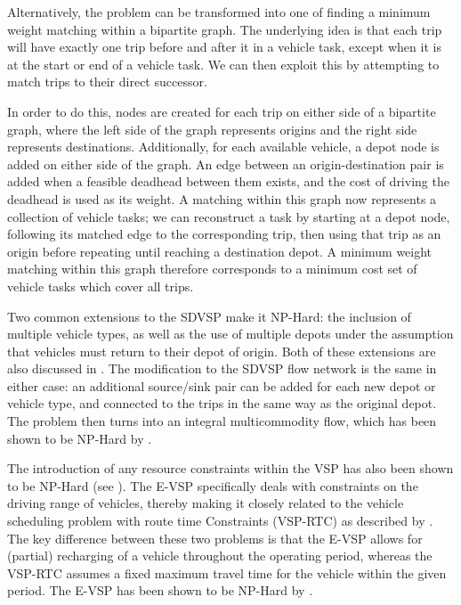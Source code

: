 \documentclass[]{article}
\begin{document}
Alternatively, the problem can be transformed into one of finding a minimum weight matching within a bipartite graph. The underlying idea is that each trip will have exactly one trip before and after it in a vehicle task, except when it is at the start or end of a vehicle task. We can then exploit this by attempting to match trips to their direct successor.

In order to do this, nodes are created for each trip on either side of a bipartite graph, where the left side of the graph represents origins and the right side represents destinations. Additionally, for each available vehicle, a depot node is added on either side of the graph. An edge between an origin-destination pair is added when a feasible deadhead between them exists, and the cost of driving the deadhead is used as its weight. A matching within this graph now represents a collection of vehicle tasks; we can reconstruct a task by starting at a depot node, following its matched edge to the corresponding trip, then using that trip as an origin before repeating until reaching a destination depot. A minimum weight matching within this graph therefore corresponds to a minimum cost set of vehicle tasks which cover all trips.

Two common extensions to the SDVSP make it NP-Hard: the inclusion of multiple vehicle types, as well as the use of multiple depots under the assumption that vehicles must return to their depot of origin. Both of these extensions are also discussed in \citet{Bunte2009}. The modification to the SDVSP flow network is the same in either case: an additional source/sink pair can be added for each new depot or vehicle type, and connected to the trips in the same way as the original depot. The problem then turns into an integral multicommodity flow, which has been shown to be NP-Hard by \citet{Even1975}.

The introduction of any resource constraints within the VSP has also been shown to be NP-Hard (see \citet{Bodin1983}). The E-VSP specifically deals with constraints on the driving range of vehicles, thereby making it closely related to the vehicle scheduling problem with route time Constraints (VSP-RTC) as described by \citet{Haghani2002}. The key difference between these two problems is that the E-VSP allows for (partial) recharging of a vehicle throughout the operating period, whereas the VSP-RTC assumes a fixed maximum travel time for the vehicle within the given period. The E-VSP has been shown to be NP-Hard by \citet{Sassi2014}. \\
\end{document}
